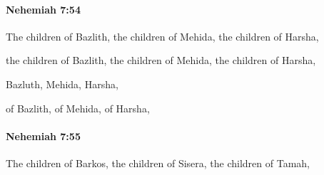 		\paragraph{Nehemiah 7:54} %
			\label{NEHEMIAH-7-54}

			The children of Bazlith, the children of Mehida, the children of Harsha,

			\begin{versebox}
					\item[BHS] 
					\item[LXX] 
					\item[ASV] the children of Bazlith, the children of Mehida, the children of Harsha,
					\item[NIV] Bazluth, Mehida, Harsha,
					\item[NRSV] of Bazlith, of Mehida, of Harsha,
			\end{versebox}

		\paragraph{Nehemiah 7:55} %
			\label{NEHEMIAH-7-55}

			The children of Barkos, the children of Sisera, the children of Tamah,


